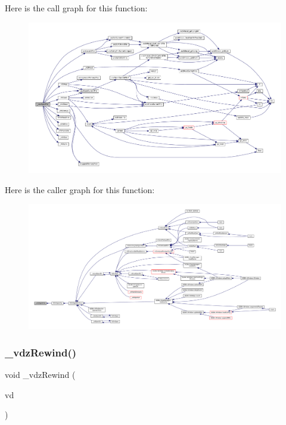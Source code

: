 Here is the call graph for this function\+:
\nopagebreak
\begin{figure}[H]
\begin{center}
\leavevmode
\includegraphics[width=350pt]{vfs-zip_8c_ac2b71e2008abddb2b5a74914eb8fe458_cgraph}
\end{center}
\end{figure}
Here is the caller graph for this function\+:
\nopagebreak
\begin{figure}[H]
\begin{center}
\leavevmode
\includegraphics[width=350pt]{vfs-zip_8c_ac2b71e2008abddb2b5a74914eb8fe458_icgraph}
\end{center}
\end{figure}
\mbox{\label{vfs-zip_8c_a01992145dbe331dad189be7ade324a00}} 
\subsubsection{\texorpdfstring{\+\_\+vdz\+Rewind()}{\_vdzRewind()}}
{\footnotesize\ttfamily void \+\_\+vdz\+Rewind (\begin{DoxyParamCaption}\item[{struct V\+Dir $\ast$}]{vd }\end{DoxyParamCaption})\hspace{0.3cm}{\ttfamily [static]}}

